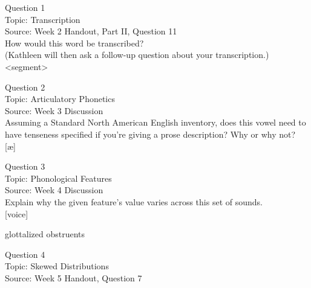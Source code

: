 \documentclass[12pt]{article}
\begin{document}
\begin{center}
\textbf{{\color{blue}{\HUGE START OF EXAM\\}}}

\textbf{{\color{blue}{\HUGE Student ID: 70352\\}}}

\textbf{{\color{blue}{\HUGE \\}}}

\end{center}
\newpage

{\large Question 1}\\

Topic: Transcription\\
Source: Week 2 Handout, Part II, Question 11\\

How would this word be transcribed?\\ (Kathleen will then ask a follow-up question about your transcription.)\\

<segment>


\newpage

{\large Question 2}\\

Topic: Articulatory Phonetics\\
Source: Week 3 Discussion\\

Assuming a Standard North American English inventory, does this vowel need to have tenseness specified if you're giving a prose description? Why or why not?\\

{[æ]}


\newpage

{\large Question 3}\\

Topic: Phonological Features\\
Source: Week 4 Discussion\\

Explain why the given feature's value varies across this set of sounds.\\

{[voice]}

glottalized obstruents


\newpage

{\large Question 4}\\

Topic: Skewed Distributions\\
Source: Week 5 Handout, Question 7\\
\end{document}
